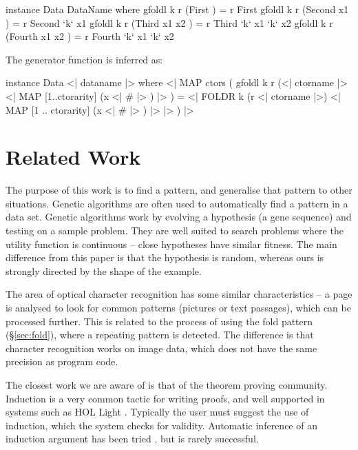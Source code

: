 \documentclass[preprint]{sigplanconf}
\begin{document}
\begin{code}
instance Data DataName where
    gfoldl k r (First          ) = r First
    gfoldl k r (Second  x1     ) = r Second  `k` x1
    gfoldl k r (Third   x1 x2  ) = r Third   `k` x1 `k` x2
    gfoldl k r (Fourth  x1 x2  ) = r Fourth  `k` x1 `k` x2
\end{code}

\noindent The generator function is inferred as:

\begin{code}
instance Data \? <| dataname |> where
    <| MAP ctors (
        gfoldl k r
            (<| ctorname |> \? <| MAP [1..ctorarity] (x <| # |> ) |> ) =
            <| FOLDR k (r \? <| ctorname |>)
                <| MAP [1 .. ctorarity] (x <| # |> ) |>
            |>
    ) |>
\end{code}

\section{Related Work}
\label{sec:related}

The purpose of this work is to find a pattern, and generalise that pattern to other situations. Genetic algorithms \cite{genetic_algorithms} are often used to automatically find a pattern in a data set. Genetic algorithms work by evolving a hypothesis (a gene sequence) and testing on a sample problem. They are well suited to search problems where the utility function is continuous -- close hypotheses have similar fitness. The main difference from this paper is that the hypothesis is random, whereas ours is strongly directed by the shape of the example.

The area of optical character recognition \cite{ocr} has some similar characteristics -- a page is analysed to look for common patterns (pictures or text passages), which can be processed further. This is related to the process of using the fold pattern (\S\ref{sec:fold}), where a repeating pattern is detected. The difference is that character recognition works on image data, which does not have the same precision as program code.

The closest work we are aware of is that of the theorem proving community. Induction is a very common tactic for writing proofs, and well supported in systems such as HOL Light \cite{hol_light}. Typically the user must suggest the use of induction, which the system checks for validity. Automatic inference of an induction argument has been tried \cite{mintchev:reasoning}, but is rarely successful.
\end{document}
